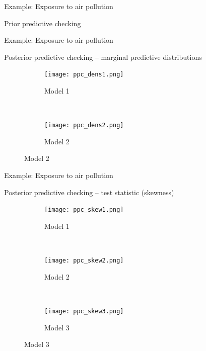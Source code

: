 \documentclass[t]{beamer}
\begin{document}
\begin{frame}

  {\Large\color{navyblue} Example: Exposure to air pollution}

  Prior predictive checking

  \begin{center}
\end{center}
\end{frame}

\begin{frame}

  {\Large\color{navyblue} Example: Exposure to air pollution}

  Posterior predictive checking -- marginal predictive distributions
\begin{figure}
\centering
\begin{subfigure}{0.48\textwidth}
\texttt{[image: ppc\_dens1.png]}
\caption{Model 1}
\end{subfigure}
~
\begin{subfigure}{0.48\textwidth}
\texttt{[image: ppc\_dens2.png]}
\caption{Model 2}
\end{subfigure}
\end{figure}

\end{frame}

\begin{frame}

  {\Large\color{navyblue} Example: Exposure to air pollution}


  Posterior predictive checking -- test statistic (skewness)
\begin{figure}
\centering
\begin{subfigure}{0.31\textwidth}
\texttt{[image: ppc\_skew1.png]}
\caption{Model 1}
\end{subfigure}
~
\begin{subfigure}{0.31\textwidth}
\texttt{[image: ppc\_skew2.png]}
\caption{Model 2}
\end{subfigure}
~
\begin{subfigure}{0.31\textwidth}
\texttt{[image: ppc\_skew3.png]}
\caption{Model 3}
\end{subfigure}

\end{figure}

\end{frame}
\end{document}
